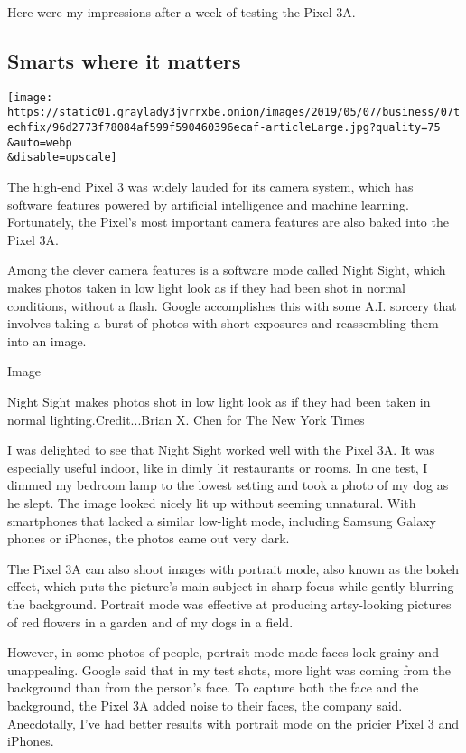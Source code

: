 Here were my impressions after a week of testing the Pixel 3A.

\hypertarget{smarts-where-it-matters}{%
\subsection{Smarts where it matters}\label{smarts-where-it-matters}}

\texttt{[image: https://static01.graylady3jvrrxbe.onion/images/2019/05/07/business/07techfix/96d2773f78084af599f590460396ecaf-articleLarge.jpg?quality=75\\\&auto=webp\\\&disable=upscale]}

The high-end Pixel 3 was widely lauded for its camera system, which has
software features powered by artificial intelligence and machine
learning. Fortunately, the Pixel's most important camera features are
also baked into the Pixel 3A.

Among the clever camera features is a software mode called Night Sight,
which makes photos taken in low light look as if they had been shot in
normal conditions, without a flash. Google accomplishes this with some
A.I. sorcery that involves taking a burst of photos with short exposures
and reassembling them into an image.

Image

Night Sight makes photos shot in low light look as if they had been
taken in normal lighting.Credit...Brian X. Chen for The New York Times

I was delighted to see that Night Sight worked well with the Pixel 3A.
It was especially useful indoor, like in dimly lit restaurants or rooms.
In one test, I dimmed my bedroom lamp to the lowest setting and took a
photo of my dog as he slept. The image looked nicely lit up without
seeming unnatural. With smartphones that lacked a similar low-light
mode, including Samsung Galaxy phones or iPhones, the photos came out
very dark.

The Pixel 3A can also shoot images with portrait mode, also known as the
bokeh effect, which puts the picture's main subject in sharp focus while
gently blurring the background. Portrait mode was effective at producing
artsy-looking pictures of red flowers in a garden and of my dogs in a
field.

However, in some photos of people, portrait mode made faces look grainy
and unappealing. Google said that in my test shots, more light was
coming from the background than from the person's face. To capture both
the face and the background, the Pixel 3A added noise to their faces,
the company said. Anecdotally, I've had better results with portrait
mode on the pricier Pixel 3 and iPhones.

